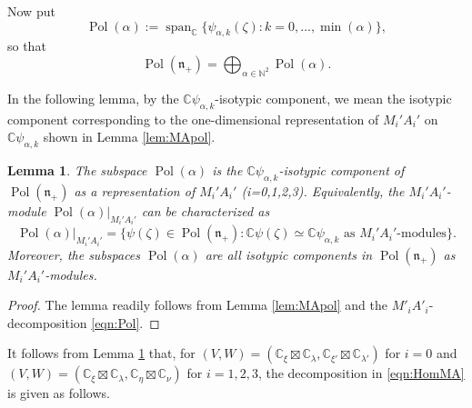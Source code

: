 \documentclass[a4paper,11pt,reqno]{amsart}
\newcommand{\frakn}{\mathfrak{n}}
\newcommand{\CC}{\mathbb{C}}
\newcommand{\0}{{\bf 0}}
\newcommand{\N}{\mathbb{N}}
\newcommand{\C}{\mathbb{C}}
\newcommand{\1}{{\bf 1}}
\DeclareMathOperator{\Span}{span}
\DeclareMathOperator{\Pol}{Pol}
\theoremstyle{plain}
\newtheorem{lemma}[equation]{Lemma}
\theoremstyle{definition}
\numberwithin{equation}{section}
\theoremstyle{definition}
\begin{document}
Now put
\begin{equation}\label{eq:DefinitionPol(alpha)}
\Pol(\alpha) := \Span_\C\{\psi_{\alpha,k}(\zeta): k=0, \ldots, \min(\alpha)\},
\end{equation}
so that 
\begin{equation}\label{eqn:Pol}
\Pol(\frakn_+) = \bigoplus_{\alpha \in \N^2} \Pol(\alpha).
\end{equation}

In the following lemma, by the $\C \psi_{\alpha,k}$-isotypic component,
we mean the isotypic component corresponding to
the one-dimensional representation of $M_i'A_i'$ on $\C \psi_{\alpha,k}$ shown in Lemma \ref{lem:MApol}.

\begin{lemma}\label{lem:MApol2}
The subspace
$\Pol(\alpha)$ is the $\C \psi_{\alpha,k}$-isotypic 
component of $\Pol(\frakn_+)$ as a representation of $M_i'A_i'$ (i=0,1,2,3).
Equivalently, the $M_i'A_i'$-module 
$\Pol(\alpha)\big\vert_{M_i'A_i'}$  can be characterized as 
\begin{equation}\label{eqn:Pol_alpha_MjAj}
\Pol(\alpha)\big\vert_{M_i'A_i'}
=\{\psi(\zeta) \in \Pol(\frakn_+):
\text{$\C \psi(\zeta) \simeq \C \psi_{\alpha,k}$ as $M_i'A_i'$-modules}\}.
\end{equation}
Moreover, the subspaces $\Pol(\alpha)$ are all 
isotypic components in $\Pol(\frakn_+)$ as $M_i'A_i'$-modules.
\end{lemma}

\begin{proof}
The lemma readily follows from Lemma \ref{lem:MApol}  and the $M'_iA'_i$-decomposition \eqref{eqn:Pol}.
\end{proof}

It follows from Lemma \ref{lem:MApol2} that,
for $(V,W) = (\CC_\xi\boxtimes \CC_{\lambda},\CC_{\xi'}\boxtimes \CC_{\lambda'})$
for $i=0$ and 
$(V,W) = (\CC_\xi\boxtimes \CC_{\lambda},\CC_{\eta}\boxtimes \CC_{\nu})$
for $i=1,2,3$, the decomposition in  \eqref{eqn:HomMA} is given as follows.

\vskip 0.1in
\end{document}
